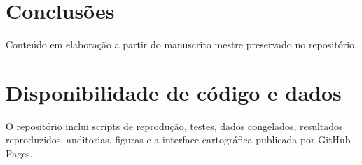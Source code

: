 \documentclass{article}
\begin{document}
\section{Conclusões}
Conteúdo em elaboração a partir do manuscrito mestre preservado no repositório.

\section*{Disponibilidade de código e dados}
O repositório inclui scripts de reprodução, testes, dados congelados, resultados reproduzidos, auditorias, figuras e a interface cartográfica publicada por GitHub Pages.
\end{document}
